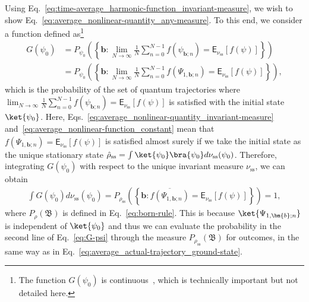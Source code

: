 \documentclass[preprint,pteplogo]{ptephy_v2}%
\numberwithin{equation}{section}
\theoremstyle{definition}
\begin{document}
Using Eq.~\eqref{eq:time-average_harmonic-function_invariant-measure}, we wish to show Eq.~\eqref{eq:average_nonlinear-quantity_any-measure}. 
To this end, we consider a function defined as\footnote{
The function $G(\psi_0)$ is continuous~\cite{benoist2023limit}, which is technically important but not detailed here.
}
\begin{align}
    G(\psi_0)&=P_{\psi_0}\left(\left\{\bm{b}
    :\lim_{N\rightarrow\infty}
    \frac{1}{N}\sum_{n=0}^{N-1}
    f(\psi_{\bm{b};n})=\mathsf{E}_{\nu_\mathrm{ss}}[f(\psi)]\right\}\right)\nonumber\\
    &=P_{\psi_0}\left(\left\{\bm{b}
    :\lim_{N\rightarrow\infty}
    \frac{1}{N}\sum_{n=0}^{N-1}
    f(\Psi_{1,\bm{b};n})=\mathsf{E}_{\nu_\mathrm{ss}}[f(\psi)]\right\}\right),
    \label{eq:G-psi}
\end{align}
which is the probability of the set of quantum trajectories where $\lim_{N\rightarrow\infty}\frac{1}{N}\sum_{n=0}^{N-1}f(\psi_{\bm{b};n})=\mathsf{E}_{\nu_\mathrm{ss}}[f(\psi)]$ is satisfied with the initial state $\ket{\psi_0}$.
Here, Eqs.~\eqref{eq:average_nonlinear-quantity_invariant-measure} and~\eqref{eq:average_nonlinear-function_constant} mean that $\overline{f(\Psi_{1,\bm{b};n})}=\mathsf{E}_{\nu_\mathrm{ss}}[f(\psi)]$ is satisfied almost surely if we take the initial state as the unique stationary state $\hat{\rho}_\mathrm{ss}=\int\ket{\psi_0}\bra{\psi_0}d\nu_\mathrm{ss}(\psi_0)$. 
Therefore, integrating $G(\psi_0)$ with respect to the unique invariant measure $\nu_\mathrm{ss}$, we can obtain
\begin{align}
    \int G(\psi_0)d\nu_\mathrm{ss}(\psi_0)=P_{\rho_\mathrm{ss}}\left(\left\{\bm{b}
    :\overline{f(\Psi_{1,\bm{b};n})}=\mathsf{E}_{\nu_\mathrm{ss}}[f(\psi)]\right\}\right)=1,
    \label{eq:integral_G-psi}
\end{align}
where $P_\rho(\mathfrak{B})$ is defined in Eq.~\eqref{eq:born-rule}.
This is because $\ket{\Psi_{1,\bm{b};n}}$ is independent of $\ket{\psi_0}$ and thus we can evaluate the probability in the second line of Eq.~\eqref{eq:G-psi} through the measure $P_{\rho_\mathrm{ss}}(\mathfrak{B})$ for outcomes, in the same way as in Eq.~\eqref{eq:average_actual-trajectory_ground-state}. 
\end{document}
